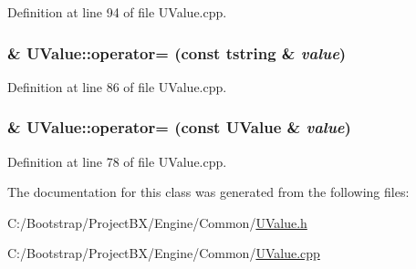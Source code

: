 Definition at line 94 of file UValue.cpp.\hypertarget{class_u_value_29e11fbc8f0f6a4c24d6c9fdf0035deb}{
\subsubsection[{operator=}]{ \& UValue::operator= (const {\bf tstring} \& {\em value})}}
\label{class_u_value_29e11fbc8f0f6a4c24d6c9fdf0035deb}




Definition at line 86 of file UValue.cpp.\hypertarget{class_u_value_869829cbcc11ae6324b9e57de53669e6}{
\subsubsection[{operator=}]{ \& UValue::operator= (const {\bf UValue} \& {\em value})}}
\label{class_u_value_869829cbcc11ae6324b9e57de53669e6}




Definition at line 78 of file UValue.cpp.

The documentation for this class was generated from the following files:\begin{CompactItemize}
\item 
C:/Bootstrap/ProjectBX/Engine/Common/\hyperlink{_u_value_8h}{UValue.h}\item 
C:/Bootstrap/ProjectBX/Engine/Common/\hyperlink{_u_value_8cpp}{UValue.cpp}\end{CompactItemize}
